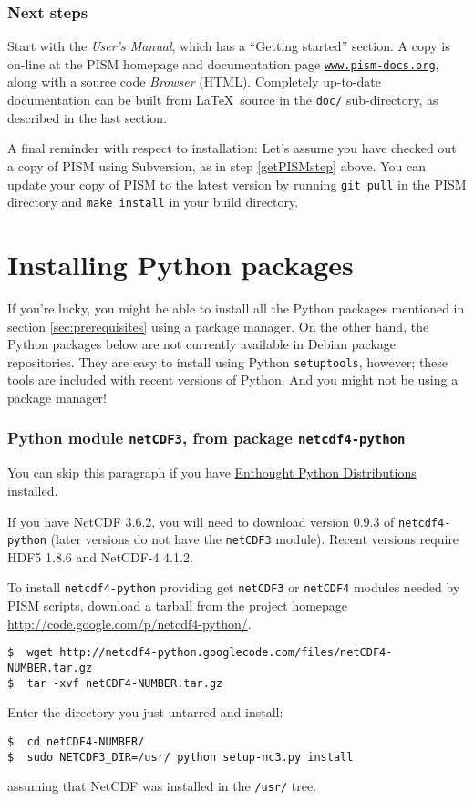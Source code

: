 \documentclass[11pt,final]{amsart}
\renewcommand{\t}[1]{\texttt{#1}}
\begin{document}
\subsubsection*{Next steps}  Start with the \emph{User's Manual}, which has a ``Getting started'' section.  A copy is on-line at the PISM homepage and documentation page \href{http://www.pism-docs.org/}{\t{www.pism-docs.org}}, along with a source code \emph{Browser} (HTML).  Completely up-to-date documentation can be built from \LaTeX~source in the \texttt{doc/} sub-directory, as described in the last section.

A final reminder with respect to installation:  Let's assume you have checked out a copy of PISM using Subversion, as in step
\ref{getPISMstep} above.  You can update your copy of PISM to the latest version by running \texttt{git pull} in the PISM directory
and \texttt{make install} in your build directory.


\newpage
\section{Installing Python packages}
\label{sec:python}

If you're lucky, you might be able to install all the Python packages mentioned in section \ref{sec:prerequisites} using a package manager. On the other hand, the Python packages below are not currently available in Debian package repositories. They are easy to install using Python \texttt{setuptools}, however; these tools are included with recent versions of Python.  And you might not be using a package manager!

\subsubsection*{Python module \texttt{netCDF3}, from package \texttt{netcdf4-python}}  You can skip this paragraph if you have
\href{http://www.enthought.com/}{Enthought Python Distributions} installed.

If you have NetCDF 3.6.2, you will need to download version 0.9.3 of \texttt{netcdf4-python} (later versions do not have the
\texttt{netCDF3} module). Recent versions require HDF5 1.8.6 and NetCDF-4 4.1.2.

To install \texttt{netcdf4-python} providing get \texttt{netCDF3} or \texttt{netCDF4} modules needed by PISM scripts, download a
tarball from the project homepage \url{http://code.google.com/p/netcdf4-python/}.

\begin{verbatim}
$  wget http://netcdf4-python.googlecode.com/files/netCDF4-NUMBER.tar.gz
$  tar -xvf netCDF4-NUMBER.tar.gz
\end{verbatim}
Enter the directory you just untarred and install:
\begin{verbatim}
$  cd netCDF4-NUMBER/
$  sudo NETCDF3_DIR=/usr/ python setup-nc3.py install
\end{verbatim}
assuming that NetCDF was installed in the \texttt{/usr/} tree.
\end{document}
